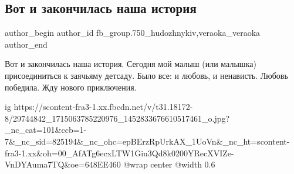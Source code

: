  
 
 
 
 

\subsection{Вот и закончилась наша история}
\label{sec:03_04_2018.fb.fb_group.750_hudozhnykiv.7.vot_i_zakonchilas_nasha_istoria}
 
\ifcmt
 author_begin
   author_id fb_group.750_hudozhnykiv,veraoka_veraoka
 author_end
\fi

Вот и закончилась наша история. Сегодня мой малыш (или малышка) присоединиться
к заячьяму детсаду. Было все: и любовь, и ненависть. Любовь победила. Жду
нового приключения.

\ifcmt
  ig https://scontent-fra3-1.xx.fbcdn.net/v/t31.18172-8/29744842_1715063785220976_1452833676610517461_o.jpg?_nc_cat=101&ccb=1-7&_nc_sid=825194&_nc_ohc=epBErzRpUrkAX_1UoVn&_nc_ht=scontent-fra3-1.xx&oh=00_AfATg6ecxLTW1Giu3Qd8k0200YRecXVIZe-VnDYAuma7TQ&oe=648EE460
  @wrap center
  @width 0.6
\fi

